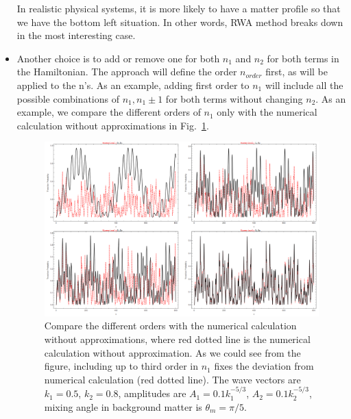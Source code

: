\begin{itemize}
   In realistic physical systems, it is more likely to have a matter profile so that we have the bottom left situation. In other words, RWA method breaks down in the most interesting case.

\item Another choice is to add or remove one for both $n_1$ and $n_2$ for both terms in the Hamiltonian. The approach will define the order $n_{order}$ first, as will be applied to the n's. As an example, adding first order to $n_1$ will include all the possible combinations of $n_1,n_1\pm 1$ for both terms without changing $n_2$. As an example, we compare the different orders of $n_1$ only with the numerical calculation without approximations in Fig.~\ref{chap:matter-sec:jacobi-subsec:multi-matter-freq-fig:stimulated-2-freq-higher-orders-approach-2}.


\begin{figure}[!htbp]
    \centering
    \includegraphics[width=\textwidth]{chapters/assets/rabi/stimulated-2-freq-higher-orders-approach-2.png}
    \caption{Compare the different orders with the numerical calculation without approximations, where red dotted line is the numerical calculation without approximation. As we could see from the figure, including up to third order in $n_1$ fixes the deviation from numerical calculation (red dotted line). The wave vectors are $k_1=0.5$, $k_2=0.8$, amplitudes are $A_1=0.1 k_1^{-5/3}$, $A_2=0.1 k_2^{-5/3}$, mixing angle in background matter is $\theta_m=\pi/5$.}
    \label{chap:matter-sec:jacobi-subsec:multi-matter-freq-fig:stimulated-2-freq-higher-orders-approach-2}
\end{figure}

   
      


\end{itemize}
